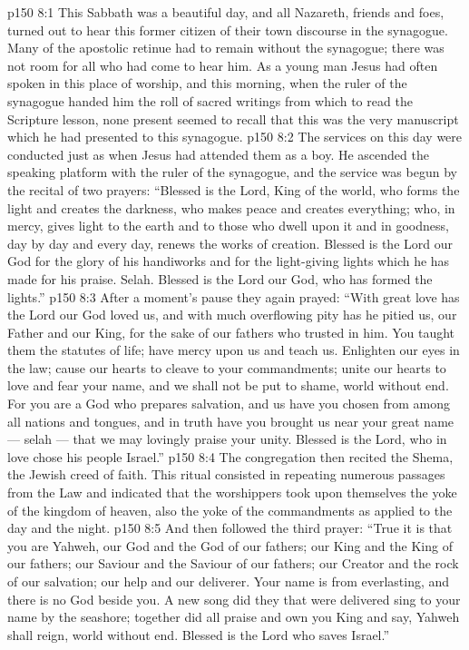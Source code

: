 \vs p150 8:1 This Sabbath was a beautiful day, and all Nazareth, friends and foes, turned out to hear this former citizen of their town discourse in the synagogue. Many of the apostolic retinue had to remain without the synagogue; there was not room for all who had come to hear him. As a young man Jesus had often spoken in this place of worship, and this morning, when the ruler of the synagogue handed him the roll of sacred writings from which to read the Scripture lesson, none present seemed to recall that this was the very manuscript which he had presented to this synagogue.
\vs p150 8:2 The services on this day were conducted just as when Jesus had attended them as a boy. He ascended the speaking platform with the ruler of the synagogue, and the service was begun by the recital of two prayers: “Blessed is the Lord, King of the world, who forms the light and creates the darkness, who makes peace and creates everything; who, in mercy, gives light to the earth and to those who dwell upon it and in goodness, day by day and every day, renews the works of creation. Blessed is the Lord our God for the glory of his handiworks and for the light\hyp{}giving lights which he has made for his praise. Selah. Blessed is the Lord our God, who has formed the lights.”
\vs p150 8:3 After a moment’s pause they again prayed: “With great love has the Lord our God loved us, and with much overflowing pity has he pitied us, our Father and our King, for the sake of our fathers who trusted in him. You taught them the statutes of life; have mercy upon us and teach us. Enlighten our eyes in the law; cause our hearts to cleave to your commandments; unite our hearts to love and fear your name, and we shall not be put to shame, world without end. For you are a God who prepares salvation, and us have you chosen from among all nations and tongues, and in truth have you brought us near your great name --- selah --- that we may lovingly praise your unity. Blessed is the Lord, who in love chose his people Israel.”
\vs p150 8:4 The congregation then recited the Shema, the Jewish creed of faith. This ritual consisted in repeating numerous passages from the Law and indicated that the worshippers took upon themselves the yoke of the kingdom of heaven, also the yoke of the commandments as applied to the day and the night.
\vs p150 8:5 And then followed the third prayer: “True it is that you are Yahweh, our God and the God of our fathers; our King and the King of our fathers; our Saviour and the Saviour of our fathers; our Creator and the rock of our salvation; our help and our deliverer. Your name is from everlasting, and there is no God beside you. A new song did they that were delivered sing to your name by the seashore; together did all praise and own you King and say, Yahweh shall reign, world without end. Blessed is the Lord who saves Israel.”
